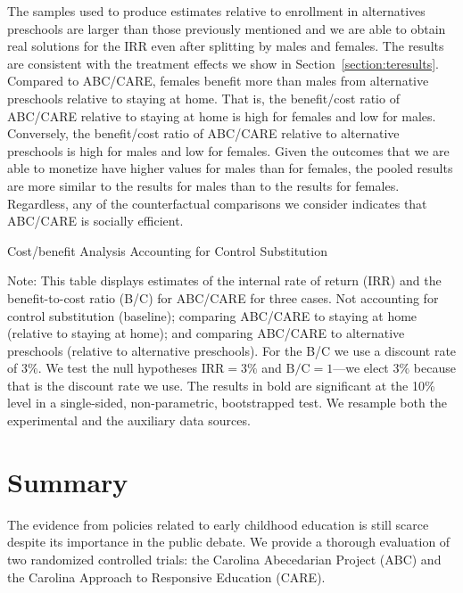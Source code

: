 The samples used to produce estimates relative to enrollment in alternatives preschools are larger than those previously mentioned and we are able to obtain real solutions for the IRR even after splitting by males and females. The results are consistent with the treatment effects we show in Section~\ref{section:teresults}. Compared to ABC/CARE, females benefit more than males from alternative preschools relative to staying at home. That is, the benefit/cost ratio of ABC/CARE relative to staying at home is high for females and low for males. Conversely, the benefit/cost ratio of ABC/CARE relative to alternative preschools is high for males and low for females. Given the outcomes that we are able to monetize have higher values for males than for females, the pooled results are more similar to the results for males than to the results for females. Regardless, any of the counterfactual comparisons we consider indicates that ABC/CARE is socially efficient.

\begin{table}[H]
\begin{threeparttable}
\caption{Cost/benefit Analysis Accounting for Control Substitution}
\label{table:cbacs}
\centering

\begin{tablenotes}
\item Note: This table displays estimates of the internal rate of return (IRR) and the benefit-to-cost ratio (B/C) for ABC/CARE for three cases. Not accounting for control substitution (baseline); comparing ABC/CARE to staying at home (relative to staying at home); and comparing ABC/CARE to alternative preschools (relative to alternative preschools). For the B/C we use a discount rate of $3\%$. We test the null hypotheses $\text{IRR} = 3\%$ and $\text{B/C} = 1$---we elect $3\%$ because that is the discount rate we use. The results in bold are significant at the 10\% level in a single-sided, non-parametric, bootstrapped test. We resample both the experimental and the auxiliary data sources.
\end{tablenotes}
\end{threeparttable}
\end{table}

\section{Summary} \label{section:conclusion}

The evidence from policies related to early childhood education is still scarce despite its importance in the public debate. We provide a thorough evaluation of two randomized controlled trials: the Carolina Abecedarian Project (ABC) and the Carolina Approach to Responsive Education (CARE).

